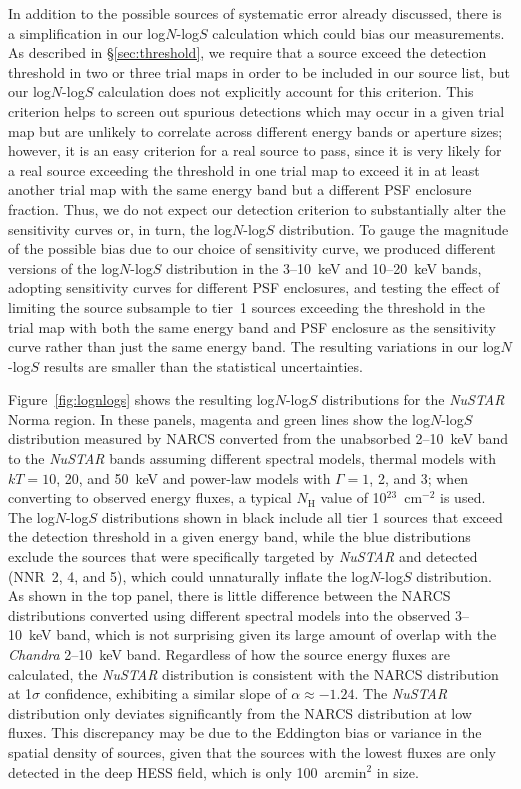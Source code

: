 \documentclass[iop,revtex4]{emulateapj}
\begin{document}
In addition to the possible sources of systematic error already discussed, there is a simplification in our log$N$-log$S$ calculation which could bias our measurements.  As described in \S\ref{sec:threshold}, we require that a source exceed the detection threshold in two or three trial maps in order to be included in our source list, but our log$N$-log$S$ calculation does not explicitly account for this criterion.  This criterion helps to screen out spurious detections which may occur in a given trial map but are unlikely to correlate across different energy bands or aperture sizes; however, it is an easy criterion for a real source to pass, since it is very likely for a real source exceeding the threshold in one trial map to exceed it in at least another trial map with the same energy band but a different PSF enclosure fraction.  Thus, we do not expect our detection criterion to substantially alter the sensitivity curves or, in turn, the log$N$-log$S$ distribution.  To gauge the magnitude of the possible bias due to our choice of sensitivity curve, we produced different versions of the log$N$-log$S$ distribution in the 3--10~keV and 10--20~keV bands, adopting sensitivity curves for different PSF enclosures, and testing the effect of limiting the source subsample to tier~1 sources exceeding the threshold in the trial map with both the same energy band and PSF enclosure as the sensitivity curve rather than just the same energy band.  The resulting variations in our log$N$-log$S$ results are smaller than the statistical uncertainties. \par
Figure~\ref{fig:lognlogs} shows the resulting log$N$-log$S$ distributions for the \textit{NuSTAR} Norma region.  In these panels, magenta and green lines show the log$N$-log$S$ distribution measured by NARCS converted from the unabsorbed 2--10~keV band to the \textit{NuSTAR} bands assuming different spectral models, thermal models with $kT=10$, 20, and 50~keV and power-law models with $\Gamma=1$, 2, and 3; when converting to observed energy fluxes, a typical $N_{\mathrm{H}}$ value of 10$^{23}$~cm$^{-2}$ is used.  The log$N$-log$S$ distributions shown in black include all tier 1 sources that exceed the detection threshold in a given energy band, while the blue distributions exclude the sources that were specifically targeted by \textit{NuSTAR} and detected (NNR~2, 4, and 5), which could unnaturally inflate the log$N$-log$S$ distribution.  As shown in the top panel, there is little difference between the NARCS distributions converted using different spectral models into the observed 3--10~keV band, which is not surprising given its large amount of overlap with the \textit{Chandra} 2--10~keV band.  Regardless of how the source energy fluxes are calculated, the \textit{NuSTAR} distribution is consistent with the NARCS distribution at 1$\sigma$ confidence, exhibiting a similar slope of $\alpha\approx-1.24$. The \textit{NuSTAR} distribution only deviates significantly from the NARCS distribution at low fluxes.  This discrepancy may be due to the Eddington bias or variance in the spatial density of sources, given that the sources with the lowest fluxes are only detected in the deep HESS field, which is only 100~arcmin$^2$ in size. \par
\end{document}
